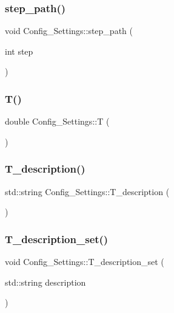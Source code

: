 \subsubsection{\texorpdfstring{step\+\_\+path()}{step\_path()}}
{\footnotesize\ttfamily void Config\+\_\+\+Settings\+::step\+\_\+path (\begin{DoxyParamCaption}\item[{int}]{step }\end{DoxyParamCaption})}

\mbox{\label{class_config___settings_a1ed40710ec225b2f91d275b4fc8f64ef}} 
\subsubsection{\texorpdfstring{T()}{T()}}
{\footnotesize\ttfamily double Config\+\_\+\+Settings\+::T (\begin{DoxyParamCaption}{ }\end{DoxyParamCaption})}

\mbox{\label{class_config___settings_a0a851a218a87393dfe8710fae9a21115}} 
\subsubsection{\texorpdfstring{T\+\_\+description()}{T\_description()}}
{\footnotesize\ttfamily std\+::string Config\+\_\+\+Settings\+::\+T\+\_\+description (\begin{DoxyParamCaption}{ }\end{DoxyParamCaption})}

\mbox{\label{class_config___settings_aab5604b25a35978883a804e6a628c6b3}} 
\subsubsection{\texorpdfstring{T\+\_\+description\+\_\+set()}{T\_description\_set()}}
{\footnotesize\ttfamily void Config\+\_\+\+Settings\+::\+T\+\_\+description\+\_\+set (\begin{DoxyParamCaption}\item[{std\+::string}]{description }\end{DoxyParamCaption})}

